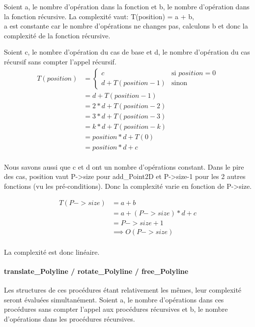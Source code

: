 \documentclass[a4paper, 11pt, oneside]{article}
\begin{document}
Soient a, le nombre d'opération dans la fonction et b, le nombre d'opération dans la fonction récursive.
La complexité vaut: T(position) = a + b, \\
a est constante car le nombre d'opérations ne changes pas, calculons b et donc la complexité de la fonction récursive.

Soient c, le nombre d'opération du cas de base et d, le nombre d'opération du cas récursif sans compter l'appel récursif.
$$
\begin{array}{ll}
T(position) 
&=\left\{
    \begin{array}{ll}
        c & \mbox{si } position = 0 \\
        d + T(position-1) & \mbox{sinon}
    \end{array}
\right.\\
&= d + T(position-1)\\
&= 2*d + T(position-2)\\
&= 3*d + T(position-3)\\
&= k*d + T(position-k)\\
&= position*d + T(0)\\
&= position*d + c\\
\end{array}
$$

Nous savons aussi que c et d ont un nombre d'opérations constant.
Dans le pire des cas, position vaut P->size pour add\_Point2D et P->size-1 pour les 2 autres fonctions (vu les pré-conditions). Donc la complexité varie en fonction de P->size.

$$
\begin{array}{ll}
T(P->size)
&= a + b\\
&= a + (P->size)*d + c\\
&= P->size + 1\\
&\implies O(P->size)\\
\end{array}
$$

La complexité est donc linéaire.

\paragraph{translate\_Polyline / rotate\_Polyline / free\_Polyline}

Les structures de ces procédures étant relativement les mêmes, leur complexité seront évaluées simultanément.
Soient a, le nombre d'opérations dans ces procédures sans compter l'appel aux procédures récursives et b, le nombre d'opérations dans les procédures récursives.
\end{document}
